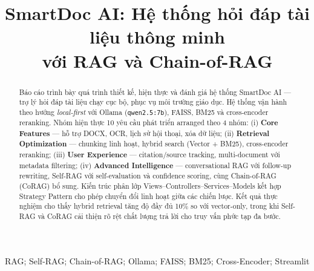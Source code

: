 \documentclass[10pt, conference, a4paper, compsocconf]{IEEEtran}
\begin{document}
\fontsize{10}{12}
\selectfont


\title{SmartDoc AI: Hệ thống hỏi đáp tài liệu thông minh\\với RAG và Chain-of-RAG}

\author{
    
}
\maketitle

\begin{abstract}
Báo cáo trình bày quá trình thiết kế, hiện thực và đánh giá hệ thống SmartDoc AI --- trợ lý hỏi đáp tài liệu chạy cục bộ, phục vụ môi trường giáo dục. Hệ thống vận hành theo hướng \textit{local-first} với Ollama (\texttt{qwen2.5:7b}), FAISS, BM25 và cross-encoder reranking. Nhóm hiện thực 10 yêu cầu phát triển arranged theo 4 nhóm: (i) \textbf{Core Features} --- hỗ trợ DOCX, OCR, lịch sử hội thoại, xóa dữ liệu; (ii) \textbf{Retrieval Optimization} --- chunking linh hoạt, hybrid search (Vector + BM25), cross-encoder reranking; (iii) \textbf{User Experience} --- citation/source tracking, multi-document với metadata filtering; (iv) \textbf{Advanced Intelligence} --- conversational RAG với follow-up rewriting, Self-RAG với self-evaluation và confidence scoring, cùng Chain-of-RAG (CoRAG) bổ sung. Kiến trúc phân lớp Views--Controllers--Services--Models kết hợp Strategy Pattern cho phép chuyển đổi linh hoạt giữa các chiến lược. Kết quả thực nghiệm cho thấy hybrid retrieval tăng độ đầy đủ 10\% so với vector-only, trong khi Self-RAG và CoRAG cải thiện rõ rệt chất lượng trả lời cho truy vấn phức tạp đa bước.
\end{abstract}

\begin{IEEEkeywords}
RAG; Self-RAG; Chain-of-RAG; Ollama; FAISS; BM25; Cross-Encoder; Streamlit
\end{IEEEkeywords}

\IEEEpeerreviewmaketitle
\end{document}
